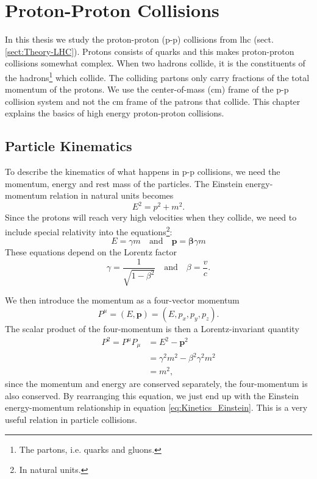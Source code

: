 \documentclass[a4paper, american, 12pt]{report}
\begin{document}
	\chapter{Proton-Proton Collisions}
	\label{chap:Theory-Proton_collisions}
	In this thesis we study the proton-proton (p-p) collisions from \acrshort{lhc} (sect.\ref{sect:Theory-LHC}). Protons consists of quarks and this makes proton-proton collisions somewhat complex. When two hadrons collide, it is the constituents of the hadrons\footnote{The partons, i.e. quarks and gluons.} which collide. The colliding partons only carry fractions of the total momentum of the protons. We use the center-of-mass (\acrshort{cm}) frame of the p-p collision system and not the \acrshort{cm} frame of the patrons that collide. This chapter explains the basics of high energy proton-proton collisions.


	\section{Particle Kinematics}
	\label{sect:Theory-Part_kinematics}
	To describe the kinematics of what happens in p-p collisions, we need the momentum, energy and rest mass of the particles. The Einstein energy-momentum relation in natural units becomes 
	\begin{equation}
	\label{eq:Kinetics_Einstein}
		E^2=p^2+m^2.
	\end{equation}
	Since the protons will reach very high velocities when they collide, we need to include special relativity into the equations\footnote{In natural units.}:
	\begin{equation}
	\label{eq:Kinematics}
		E=\gamma m \quad \text{and}\quad \textbf{p}=\boldsymbol{\beta}\gamma m
	\end{equation}
	These equations depend on the Lorentz factor
	\begin{equation*}
	\label{eq:Lorentz_factor}
		\gamma=\frac{1}{\sqrt{1-\beta^2}}\quad \text{and} \quad \beta=\frac{v}{c}.
	\end{equation*}

	We then introduce the momentum as a four-vector momentum \[P^{\mu}=(E,\textbf{p})=(E,p_x,p_y,p_z).\] The scalar product of the four-momentum is then a Lorentz-invariant quantity
	\begin{align}
	\label{eq:Four-momenta}
		P^2=P^{\mu}P_{\mu}&=E^2-\textbf{p}^2\\
		&=\gamma^2m^2-\beta^2\gamma^2m^2 \nonumber\\
		&=m^2,\nonumber
	\end{align} 
	since the momentum and energy are conserved separately, the four-momentum is also conserved. By rearranging this equation, we just end up with the Einstein energy-momentum relationship in equation \ref{eq:Kinetics_Einstein}. This is a very useful relation in particle collisions.
	
\end{document}
